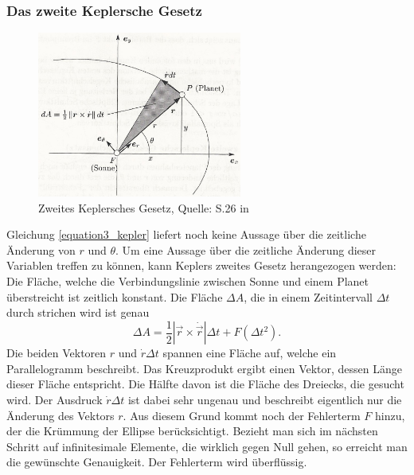 \subsubsection{Das zweite Keplersche Gesetz}
\begin{figure}[h]                                                                           %
	\centering                                                                            	%
	\includegraphics[width=0.6\textwidth]{./images/keplers_law2.jpg}                        %
	\caption[Zweites keplersches Gesetz]{Zweites Keplersches Gesetz, Quelle: S.26 in \cite{Raumflugm}}                  %
	\label{fig:kegelsch_2}                                                                  %
\end{figure}                                                                              	%
Gleichung \ref{equation3_kepler} liefert noch keine Aussage über die zeitliche Änderung von \ensuremath{r} und \ensuremath{\theta}. Um eine Aussage über die zeitliche Änderung dieser Variablen treffen zu können, kann Keplers zweites Gesetz herangezogen werden: Die Fläche, welche die Verbindungslinie zwischen Sonne und einem Planet überstreicht ist zeitlich konstant. Die Fläche \ensuremath{\Delta A}, die in einem Zeitintervall \ensuremath{\Delta t} durch strichen wird ist genau
\begin{equation}
	\Delta A = \frac{1}{2}\left| \vec{r} \times \dot{\vec{r}} \right|\Delta t + F(\Delta t^2).
\end{equation}   
Die beiden Vektoren \ensuremath{r} und \ensuremath{\dot{r} \Delta t} spannen eine Fläche auf, welche ein Parallelogramm beschreibt. Das Kreuzprodukt ergibt einen Vektor, dessen Länge dieser Fläche entspricht. Die Hälfte davon ist die Fläche des Dreiecks, die gesucht wird. Der Ausdruck \ensuremath{\dot{r} \Delta t} ist dabei sehr ungenau und beschreibt eigentlich nur die Änderung des Vektors \ensuremath{r}. Aus diesem Grund kommt noch der Fehlerterm \ensuremath{F} hinzu, der die Krümmung der Ellipse berücksichtigt. Bezieht man sich im nächsten Schritt auf infinitesimale Elemente, die wirklich gegen Null gehen, so erreicht man die gewünschte Genauigkeit. Der Fehlerterm wird überflüssig.  
